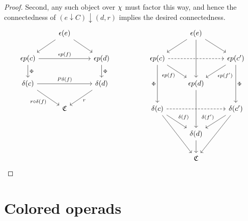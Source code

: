 \documentclass[a4paper,10pt
,draft
]{article}%
\renewcommand{\1}{\eta}%
\begin{document}
\begin{proof}
      Second, any such object over $\chi$ must factor this way, and hence the connectedness of $(e \downarrow C) \downarrow (d,r)$
      implies the desired connectedness.
      \begin{equation}
            \begin{tikzcd}
                  &
                  \epsilon(e) \arrow[dr] \arrow[dl]
                  &
                  && %
                  &
                  \epsilon(e) \arrow[dr] \arrow[dl] \arrow[dd]
                  \\
                  \epsilon p(c) \arrow[rr, "{\epsilon p (f)}"] \arrow[d, "\Phi"]
                  &&
                  \epsilon p(d) \arrow[d, "\Phi"]
                  && %
                  \epsilon p (c) \arrow[dr, "{\epsilon p (f)}"'] \arrow[dd, "\Phi"'] \arrow[rr, dashed]
                  &&
                  \epsilon p (c') \arrow[dl, "{\epsilon p (f')}"] \arrow[dd, "\Phi"]
                  \\
                  \delta(c) \arrow[rr, "{P\delta(f)}"] \arrow[dr, "{r \circ \delta(f)}"']
                  &&
                  \delta(d) \arrow[dl, "r"]
                  && %
                  &
                  \epsilon p (d) \arrow[dd]
                  \\
                  &
                  \mathfrak C
                  &
                  && %
                  \delta (c) \arrow[dr, "{\delta(f)}"] \arrow[ddr] \arrow[rr, dashed]
                  &&
                  \delta(c') \arrow[dl, "{\delta(f')}"'] \arrow[ddl]
                  \\
                  &&&& %
                  &
                  \delta(d) \arrow[d]
                  \\
                  &&&& %
                  &
                  \mathfrak C
            \end{tikzcd}
      \end{equation}
\end{proof}





\section{Colored operads}
\end{document}
